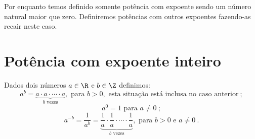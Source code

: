  Por enquanto temos definido somente potência com expoente sendo um número natural maior que zero. Definiremos potências com outros expoentes fazendo-as recair neste caso.

 \section{Potência com expoente inteiro}
 \vskip0.3cm

 \colorbox{azul}{
 \begin{minipage}{0.9\linewidth}
 \begin{center}
   Dados dois números $a \in \R$ e $b \in \Z$ definimos:
\begin{equation}
a^b= \underbrace{a \cdot a \cdot \cdots \cdot a}_{b \text{ vezes}}, \text{ para } b > 0, \text{ esta situação está inclusa no caso anterior} \ ;
\end{equation}
\begin{equation}
a^{0}= 1 \text{ para } a \neq 0 \ ;
\end{equation}
\begin{equation}
a^{-b}= \dfrac{1}{a^b}= \underbrace{\dfrac{1}{a} \cdot \dfrac{1}{a} \cdot \cdots \cdot \dfrac{1}{a}}_{b \text{ vezes}}, \text{ para } b>0 \text{ e } a \neq 0 \ .
\end{equation}
 \end{center}
 \end{minipage}}

 \vskip0.3cm

